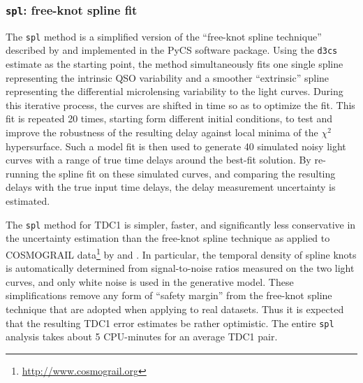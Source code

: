\documentclass[traditabstract]{aa}
\begin{document}
\subsubsection{{\tt spl}: free-knot spline fit}

The {\tt spl} method is a simplified version of the ``free-knot spline
technique'' described by \citet{pycs} and implemented in the PyCS
software package. Using the {\tt d3cs} estimate as the starting point, the
method simultaneously fits one single spline representing the
intrinsic QSO variability and a smoother ``extrinsic'' spline
representing the differential microlensing variability to the light
curves. During this iterative process, the curves are shifted in time
so as to optimize the fit. This fit is repeated 20 times, starting form
different initial conditions, to test and improve the robustness of
the resulting delay against local minima of the $\chi^2$
hypersurface. Such a model fit is then used to generate 40 simulated
noisy light curves with a range of true time delays around the
best-fit solution. By re-running the spline fit on these simulated
curves, and comparing the resulting delays with the true input time
delays, the delay measurement uncertainty is estimated.

The {\tt spl} method for TDC1 is simpler, faster, and significantly
less conservative in the uncertainty estimation than the free-knot
spline technique as applied to COSMOGRAIL
data\footnote{\url{http://www.cosmograil.org}} by \citet{Tewes:2013iz}
and \citet{RathnaKumar:2013eu}. In particular, the temporal density of spline
knots is automatically determined from signal-to-noise ratios measured on
the two light curves, and only white noise is used in the generative model.
These simplifications remove any form of ``safety margin'' from the
free-knot spline technique that are adopted when applying to real
datasets. Thus it is expected that the resulting TDC1 error estimates
be rather optimistic. The entire {\tt spl} analysis takes about 5
CPU-minutes for an average TDC1 pair.
\end{document}
